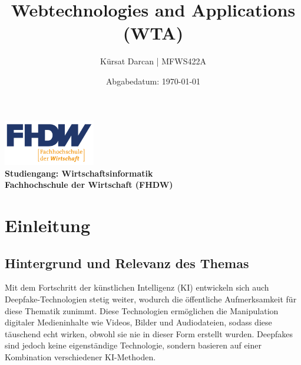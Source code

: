 \documentclass[a4paper,12pt]{article}
\title{\textbf{Webtechnologies and Applications (WTA)}}
\author{Kürsat Darcan | MFWS422A}
\date{Abgabedatum: \today}
\begin{document}
\maketitle
\thispagestyle{empty}
\vspace{2cm}
\begin{center}
    \includegraphics[width=0.3\textwidth]{FHDW_Logo_RGB-01.svg.png} %
    \\
    \vspace{1cm}
    \textbf{Studiengang: Wirtschaftsinformatik}\\
    \textbf{Fachhochschule der Wirtschaft (FHDW)}
\end{center}
\newpage

\renewcommand{\thepage}{\roman{page}} %
\tableofcontents
\newpage




\renewcommand{\thepage}{\arabic{page}} %
\setcounter{page}{1}


\section{Einleitung}
\subsection{Hintergrund und Relevanz des Themas}
Mit dem Fortschritt der künstlichen Intelligenz (KI) entwickeln sich auch Deepfake-Technologien stetig weiter, 
wodurch die öffentliche Aufmerksamkeit für diese Thematik zunimmt. 
Diese Technologien ermöglichen die Manipulation digitaler Medieninhalte wie Videos, 
Bilder und Audiodateien, sodass diese täuschend echt wirken, 
obwohl sie nie in dieser Form erstellt wurden. 
Deepfakes sind jedoch keine eigenständige Technologie, 
sondern basieren auf einer Kombination verschiedener KI-Methoden. \cite{BVDW2024}\\
\end{document}

